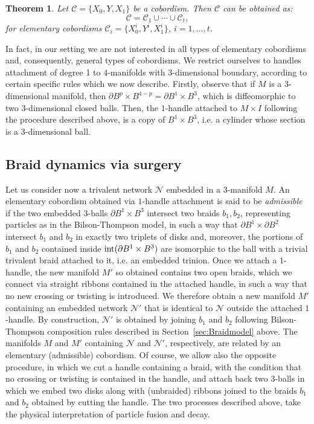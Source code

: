 \documentclass[aps,nofootinbib,amsfonts,superscriptaddress]{revtex4}
\newtheorem{theorem}{Theorem}
\begin{document}
\begin{theorem}\label{thm:cobordism}
Let $\mathcal C = \{X_0,Y,X_1\}$ be a cobordism. Then $\mathcal C$ can be obtained as:
$$
\mathcal C = \mathcal C_1 \cup \cdots \cup\mathcal C_t,
$$
for elementary cobordisms $\mathcal C_i = \{X^i_0,Y^i,X_1^i\}$, $i=1,\ldots , t$. 
\end{theorem}

In fact, in our setting we are not interested in all types of elementary cobordisms and, consequently, general types of cobordisms. We restrict ourselves to handles attachment of degree 1 to $4$-manifolds with $3$-dimensional boundary, according to certain specific rules which we now describe. Firstly, observe that if $M$ is a $3$-dimensional manifold, then $\partial B^p\times B^{4-p} = \partial B^1\times B^3$, which is diffeomorphic to two $3$-dimensional closed balls. Then, the $1$-handle attached to $M\times I$ following the procedure described above, is a copy of $B^1\times B^3$, i.e. a cylinder whose section is a $3$-dimensional ball. 

\subsection{Braid dynamics via surgery}\label{Dynamics}

Let us consider now a trivalent network $\mathcal N$ embedded in a $3$-manifold $M$. An elementary cobordism obtained via $1$-handle attachment is said to be {\it admissible} if the two embedded $3$-balls $\partial B^1\times B^3$ intersect two braids $b_1, b_2$, representing particles as in the Bilson-Thompson model, in such a way that $\partial B^1\times \partial B^2$ intersect $b_1$ and $b_2$ in exactly two triplets of disks and, moreover, the portions of $b_1$ and $b_2$ contained inside ${\rm int}(\partial B^1\times B^3)$ are isomorphic to the ball with a trivial trivalent braid attached to it, i.e. an embedded trinion. Once we attach a $1$-handle, the new manifold  $M'$ so obtained contains two open braids, which we connect via straight ribbons contained in the attached handle, in such a way that no new crossing or twisting is introduced. We therefore obtain a new manifold $M'$ containing an embedded network $\mathcal N'$ that is identical to $\mathcal N$ outside the attached $1$-handle. By construction, $\mathcal N'$ is obtained by joining $b_1$ and $b_2$ following Bilson-Thompson composition rules described in Section~\ref{sec:Braidmodel} above. The manifolds $M$ and $M'$ containing $\mathcal N$ and $\mathcal N'$, respectively, are related by an elementary (admissible) cobordism. Of course, we allow also the opposite procedure, in which we cut a handle containing a braid, with the condition that no crossing or twisting is contained in the handle, and attach back two $3$-balls in which we embed two disks along with (unbraided) ribbons joined to the braids $b_1$ and $b_2$ obtained by cutting the handle. The two processes described above, take the physical interpretation of particle fusion and decay. \\
\end{document}
